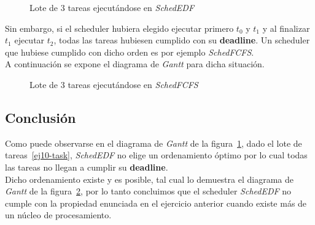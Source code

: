 \begin{figure}[H]
\centering
{}%
\caption{Lote de 3 tareas ejecutándose en \textit{SchedEDF}}
\label{ej10-edf-gantt}
\end{figure}

Sin embargo, si el scheduler hubiera elegido ejecutar primero \textit{$t_0$} y \textit{$t_1$} y al finalizar \textit{$t_1$} ejecutar \textit{$t_2$}, todas las tareas hubiesen cumplido con su \textbf{deadline}. Un scheduler que hubiese cumplido con dicho orden es por ejemplo \textit{SchedFCFS}.\\
A continuación se expone el diagrama de \textit{Gantt} para dicha situación.

\begin{figure}[h!t]
\centering
{}%
\caption{Lote de 3 tareas ejecutándose en \textit{SchedFCFS}}
\label{ej10-fcfs-gantt}
\end{figure}

\subsection{Conclusión}
 
Como puede observarse en el diagrama de \textit{Gantt} de la figura~\ref{ej10-edf-gantt}, dado el lote de tareas~\ref{ej10-task}, \textit{SchedEDF} no elige un ordenamiento óptimo por lo cual todas las tareas no llegan a cumplir su \textbf{deadline}.\\
Dicho ordenamiento existe y es posible, tal cual lo demuestra el diagrama de \textit{Gantt} de la figura~\ref{ej10-fcfs-gantt}, por lo tanto concluimos que el scheduler \textit{SchedEDF} no cumple con la propiedad enunciada en el ejercicio anterior cuando existe más de un núcleo de procesamiento.
